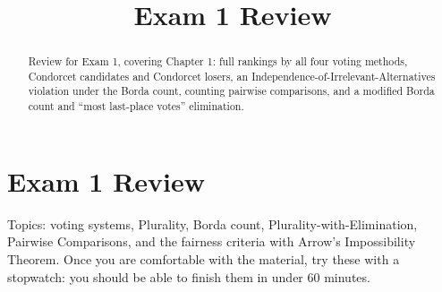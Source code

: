 \documentclass[12pt]{ximera}
\title{Exam 1 Review}
\begin{document}
\begin{abstract}
Review for Exam 1, covering Chapter 1: full rankings by all four voting methods,
Condorcet candidates and Condorcet losers, an Independence-of-Irrelevant-Alternatives
violation under the Borda count, counting pairwise comparisons, and a modified Borda
count and ``most last-place votes'' elimination.
\end{abstract}
\maketitle

\section*{Exam 1 Review}

Topics: voting systems, Plurality, Borda count, Plurality-with-Elimination, Pairwise
Comparisons, and the fairness criteria with Arrow's Impossibility Theorem. Once you are
comfortable with the material, try these with a stopwatch: you should be able to finish
them in under $60$ minutes.
\end{document}
